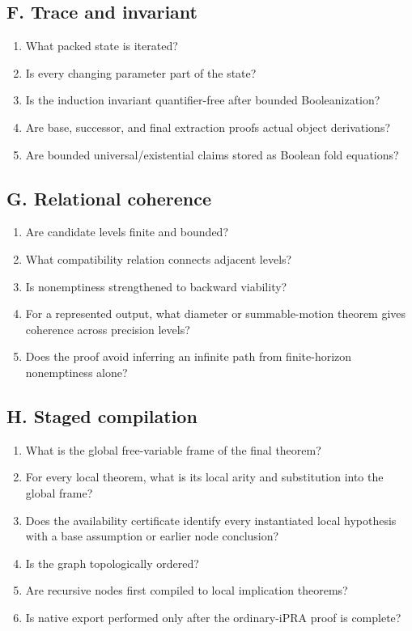 \subsection*{F. Trace and invariant}
\begin{enumerate}
  \item What packed state is iterated?
  \item Is every changing parameter part of the state?
  \item Is the induction invariant quantifier-free after bounded Booleanization?
  \item Are base, successor, and final extraction proofs actual object derivations?
  \item Are bounded universal/existential claims stored as Boolean fold equations?
\end{enumerate}

\subsection*{G. Relational coherence}
\begin{enumerate}
  \item Are candidate levels finite and bounded?
  \item What compatibility relation connects adjacent levels?
  \item Is nonemptiness strengthened to backward viability?
  \item For a represented output, what diameter or summable-motion theorem gives coherence across
        precision levels?
  \item Does the proof avoid inferring an infinite path from finite-horizon nonemptiness alone?
\end{enumerate}

\subsection*{H. Staged compilation}
\begin{enumerate}
  \item What is the global free-variable frame of the final theorem?
  \item For every local theorem, what is its local arity and substitution into the global frame?
  \item Does the availability certificate identify every instantiated local hypothesis with a base
        assumption or earlier node conclusion?
  \item Is the graph topologically ordered?
  \item Are recursive nodes first compiled to local implication theorems?
  \item Is native export performed only after the ordinary-iPRA proof is complete?
\end{enumerate}

